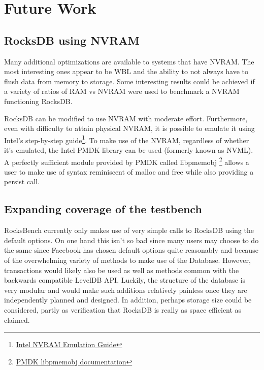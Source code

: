 \documentclass[twocolumn,11pt]{article}
\begin{document}
\section{Future Work}
\label{sec:future_work}

\subsection{RocksDB using NVRAM}
\label{subsec:nvram}

Many additional optimizations are available to systems that have NVRAM. The most
interesting ones appear to be WBL\cite{Arulraj:2016:WL:3025111.3025116} and the
ability to not always have to flush data from memory to storage. Some
interesting results could be achieved if a variety of ratios of RAM vs NVRAM
were used to benchmark a NVRAM functioning RocksDB.

RocksDB can be modified to use NVRAM with moderate effort. Furthermore, even
with difficulty to attain physical NVRAM, it is possible to emulate it using
Intel's step-by-step guide\footnote{
  \href{https://software.intel.com/en-us/articles/how-to-emulate-persistent-memory-on-an-intel-architecture-server/}
  {Intel NVRAM Emulation Guide}}.
To make use of the NVRAM, regardless of whether it's emulated, the Intel PMDK
library can be used (formerly known as NVML). A perfectly sufficient module
provided by PMDK called libpmemobj
\footnote{\href{http://pmem.io/pmdk/libpmemobj/}
{PMDK libpmemobj documentation}} allows a user to make use of syntax reminiscent
of malloc and free while also providing a persist call.

\subsection{Expanding coverage of the testbench}

RocksBench currently only makes use of very simple calls to RocksDB using the
default options. On one hand this isn't so bad since many users may choose to do
the same since Facebook has chosen default options quite reasonably and because
of the overwhelming variety of methods to make use of the Database. However,
transactions would likely also be used as well as methods common with the
backwards compatible LevelDB API. Luckily, the structure of the database is very
modular and would make such additions relatively painless once they are
independently planned and designed. In addition, perhaps storage size could be
considered, partly as verification that RocksDB is really as space efficient as
claimed.
\end{document}

